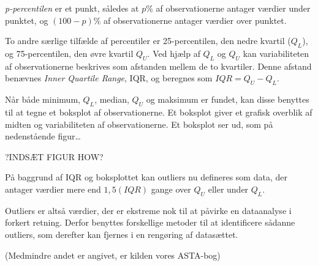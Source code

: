 \documentclass[]{article}
\begin{document}

\emph{p-percentilen} er et punkt, således at \(p \%\) af observationerne
antager værdier under punktet, og \((100 - p) \%\) af observationerne
antager værdier over punktet.

To andre særlige tilfælde af percentiler er 25-percentilen, den nedre
kvartil (\(Q_L\)), og 75-percentilen, den øvre kvartil \(Q_U\). Ved
hjælp af \(Q_L\) og \(Q_U\) kan variabiliteten af observationerne
beskrives som afstanden mellem de to kvartiler. Denne afstand benævnes
\emph{Inner Quartile Range}, IQR, og beregnes som \(IQR = Q_U - Q_L\).

Når både minimum, \(Q_L\), median, \(Q_U\) og maksimum er fundet, kan
disse benyttes til at tegne et boksplot af observationerne. Et boksplot
giver et grafisk overblik af midten og variabiliteten af
observationerne. Et boksplot ser ud, som på nedenstående figur\ldots{}

?INDSÆT FIGUR HOW?

På baggrund af IQR og boksplottet kan outliers nu defineres som data,
der antager værdier mere end \(1,5(IQR)\) gange over \(Q_U\) eller under
\(Q_L\).

Outliers er altså værdier, der er ekstreme nok til at påvirke en
dataanalyse i forkert retning. Derfor benyttes forskellige metoder til
at identificere sådanne outliers, som derefter kan fjernes i en
rengøring af datasættet.

(Medmindre andet er angivet, er kilden vores ASTA-bog)
\end{document}
